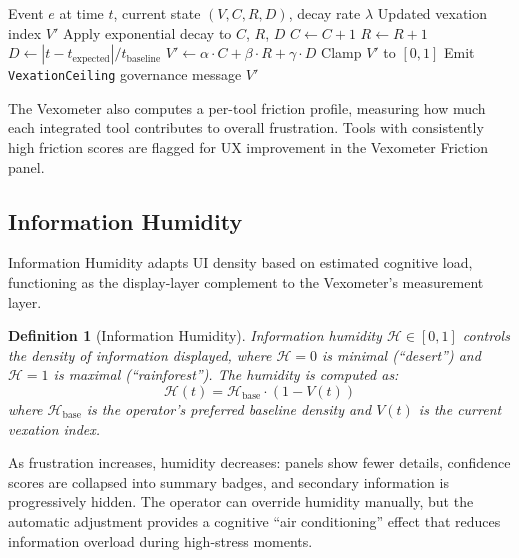 \documentclass[11pt,a4paper]{article}
\newtheorem{definition}{Definition}[section]
\begin{document}
\begin{algorithm}[t]
\caption{Vexation Index Update}\label{alg:vexometer}
\begin{algorithmic}[1]
\Require Event $e$ at time $t$, current state $(V, C, R, D)$,
  decay rate $\lambda$
\Ensure Updated vexation index $V'$
\State Apply exponential decay to $C$, $R$, $D$
  \State $C \gets C + 1$
  \State $R \gets R + 1$
  \State $D \gets |t - t_{\text{expected}}| / t_{\text{baseline}}$
\EndIf
\State $V' \gets \alpha \cdot C + \beta \cdot R + \gamma \cdot D$
\State Clamp $V'$ to $[0, 1]$
  \State Emit \texttt{VexationCeiling} governance message
\EndIf
\State \Return $V'$
\end{algorithmic}
\end{algorithm}

The Vexometer also computes a per-tool friction profile, measuring
how much each integrated tool contributes to overall frustration.
Tools with consistently high friction scores are flagged for UX
improvement in the Vexometer Friction panel.

\subsection{Information Humidity}

Information Humidity adapts UI density based on estimated cognitive
load, functioning as the display-layer complement to the Vexometer's
measurement layer.

\begin{definition}[Information Humidity]\label{def:humidity}
Information humidity $\mathcal{H} \in [0, 1]$ controls the density of
information displayed, where $\mathcal{H} = 0$ is minimal (``desert'')
and $\mathcal{H} = 1$ is maximal (``rainforest''). The humidity is
computed as:
\[
  \mathcal{H}(t) = \mathcal{H}_{\text{base}} \cdot (1 - V(t))
\]
where $\mathcal{H}_{\text{base}}$ is the operator's preferred baseline
density and $V(t)$ is the current vexation index.
\end{definition}

As frustration increases, humidity decreases: panels show fewer
details, confidence scores are collapsed into summary badges,
and secondary information is progressively hidden. The operator
can override humidity manually, but the automatic adjustment
provides a cognitive ``air conditioning'' effect that reduces
information overload during high-stress moments.
\end{document}
